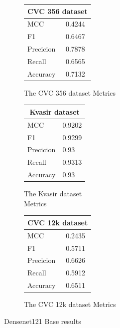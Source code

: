 \begin{figure}
\vspace{1cm}

\begin{subfigure}[t]{0.25\textwidth}
\begin{tabular}{ll}      
        \toprule
        \multicolumn{2}{c}{CVC 356 dataset}        \\
        \midrule
        MCC 		& 0.4244 \\
        F1  		& 0.6467 \\
        Precicion  	& 0.7878 \\
        Recall     	& 0.6565 \\
        Accuracy	& 0.7132 \\
        \bottomrule
        \end{tabular}
\caption{The CVC 356 dataset Metrics}
\label{tab:cvc356_metrics_DN121_base}
\end{subfigure}%
\begin{subfigure}[t]{0.49\textwidth}
    	\centering
        \begin{tabular}{ll}
        \toprule
        \multicolumn{2}{c}{Kvasir dataset}        \\
        \midrule
        MCC 		& 0.9202 \\
        F1  		& 0.9299 \\
        Precicion  	& 0.93 \\
        Recall     	& 0.9313  \\
        Accuracy	& 0.93 \\
        
        \bottomrule
\end{tabular}
\caption{The Kvasir dataset\\ Metrics}
\label{tab:kvasir_metrics_DN121_base}
\end{subfigure}%
\begin{subfigure}[t]{0.25\textwidth}
        \begin{tabular}{ll}
        \toprule
        \multicolumn{2}{c}{CVC 12k dataset}        \\
        \midrule
        MCC 		& 0.2435  \\
        F1  		& 0.5711 \\
        Precicion  	& 0.6626 \\
        Recall     	& 0.5912 \\
        Accuracy	& 0.6511 \\
        \bottomrule
        \end{tabular}
\caption{The CVC 12k dataset Metrics}
\label{tab:cvc12k_metrics_DN121_base}
\end{subfigure}
\caption{Densenet121 Base results}
\label{fig:results_DN121_base}
\end{figure}



